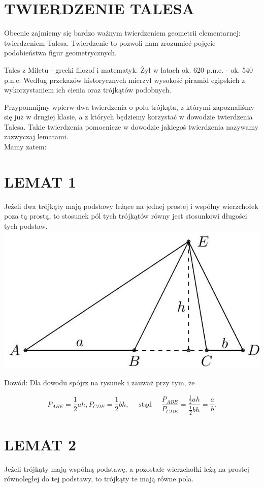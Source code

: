 \documentclass[10pt]{article}
\begin{document}
\section*{TWIERDZENIE TALESA}
Obecnie zajmiemy się bardzo ważnym twierdzeniem geometrii elementarnej: twierdzeniem Talesa. Twierdzenie to pozwoli nam zrozumieć pojęcie podobieństwa figur geometrycznych.

Tales z Miletu - grecki filozof i matematyk. Żył w latach ok. 620 p.n.e. - ok. 540 p.n.e. Według przekazów historycznych mierzył wysokość piramid egipskich z wykorzystaniem ich cienia oraz trójkątów podobnych.

Przypomnijmy wpierw dwa twierdzenia o polu trójkąta, z którymi zapoznaliśmy się już w drugiej klasie, a z których będziemy korzystać w dowodzie twierdzenia Talesa. Takie twierdzenia pomocnicze w dowodzie jakiegoś twierdzenia nazywamy zazwyczaj lematami.\\
Mamy zatem:

\section*{LEMAT 1}
Jeżeli dwa trójkąty mają podstawy leżące na jednej prostej i wspólny wierzchołek poza tą prostą, to stosunek pól tych trójkątów równy jest stosunkowi długości tych podstaw.\\
\includegraphics[max width=\textwidth, center]{2024_11_21_e9b4faa005d5be2cc318g-005}

Dowód: Dla dowodu spójrz na rysunek i zauważ przy tym, że

\[
P_{A B E}=\frac{1}{2} a h, P_{C D E}=\frac{1}{2} b h, \quad \text { stąd } \quad \frac{P_{A B E}}{P_{C D E}}=\frac{\frac{1}{2} a h}{\frac{1}{2} b h}=\frac{a}{b} .
\]

\section*{LEMAT 2}
Jeżeli trójkąty mają wspólną podstawę, a pozostałe wierzchołki leżą na prostej równoległej do tej podstawy, to trójkąty te mają równe pola.
\end{document}
